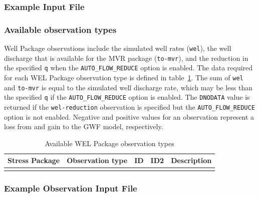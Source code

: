 \subsubsection{Example Input File}


\vspace{5mm}
\subsubsection{Available observation types}
Well Package observations include the simulated well rates (\texttt{wel}), the well discharge that is available for the MVR package (\texttt{to-mvr}), and the reduction in the specified \texttt{q} when the \texttt{AUTO\_FLOW\_REDUCE} option is enabled. The data required for each WEL Package observation type is defined in table~\ref{table:gwf-welobstype}. The sum of \texttt{wel} and \texttt{to-mvr} is equal to the simulated well discharge rate, which may be less than the specified \texttt{q} if the \texttt{AUTO\_FLOW\_REDUCE} option is enabled. The \texttt{DNODATA} value is returned if the \texttt{wel-reduction} observation is specified but the \texttt{AUTO\_FLOW\_REDUCE} option is not enabled. Negative and positive values for an observation represent a loss from and gain to the GWF model, respectively.

\begin{longtable}{p{2cm} p{2.75cm} p{2cm} p{1.25cm} p{7cm}}
\caption{Available WEL Package observation types} \tabularnewline

\hline
\hline
\textbf{Stress Package} & \textbf{Observation type} & \textbf{ID} & \textbf{ID2} & \textbf{Description} \\
\hline
\endhead

\hline
\endfoot


\label{table:gwf-welobstype}
\end{longtable}

\vspace{5mm}
\subsubsection{Example Observation Input File}

